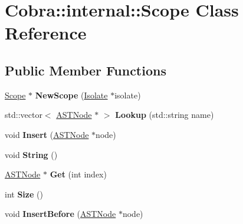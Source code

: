 \hypertarget{class_cobra_1_1internal_1_1_scope}{\section{Cobra\+:\+:internal\+:\+:Scope Class Reference}
\label{class_cobra_1_1internal_1_1_scope}
}
\subsection*{Public Member Functions}
\begin{DoxyCompactItemize}
\item 
\hypertarget{class_cobra_1_1internal_1_1_scope_a8a7296ef13e2f0c58950811bdca42576}{\hyperlink{class_cobra_1_1internal_1_1_scope}{Scope} $\ast$ {\bfseries New\+Scope} (\hyperlink{class_cobra_1_1internal_1_1_isolate}{Isolate} $\ast$isolate)}\label{class_cobra_1_1internal_1_1_scope_a8a7296ef13e2f0c58950811bdca42576}

\item 
\hypertarget{class_cobra_1_1internal_1_1_scope_acb50f97a2ee64adfd97a35fca951def6}{std\+::vector$<$ \hyperlink{class_cobra_1_1internal_1_1_a_s_t_node}{A\+S\+T\+Node} $\ast$ $>$ {\bfseries Lookup} (std\+::string name)}\label{class_cobra_1_1internal_1_1_scope_acb50f97a2ee64adfd97a35fca951def6}

\item 
\hypertarget{class_cobra_1_1internal_1_1_scope_a9a3ba5f69a60e821246b2234d7648508}{void {\bfseries Insert} (\hyperlink{class_cobra_1_1internal_1_1_a_s_t_node}{A\+S\+T\+Node} $\ast$node)}\label{class_cobra_1_1internal_1_1_scope_a9a3ba5f69a60e821246b2234d7648508}

\item 
\hypertarget{class_cobra_1_1internal_1_1_scope_aaebe9d128689e9bf14661ee56cf23fa6}{void {\bfseries String} ()}\label{class_cobra_1_1internal_1_1_scope_aaebe9d128689e9bf14661ee56cf23fa6}

\item 
\hypertarget{class_cobra_1_1internal_1_1_scope_a3d2c6d4045bacad731303aabb2babfb1}{\hyperlink{class_cobra_1_1internal_1_1_a_s_t_node}{A\+S\+T\+Node} $\ast$ {\bfseries Get} (int index)}\label{class_cobra_1_1internal_1_1_scope_a3d2c6d4045bacad731303aabb2babfb1}

\item 
\hypertarget{class_cobra_1_1internal_1_1_scope_a8e08e196bd7915f62fdc826ecd040c75}{int {\bfseries Size} ()}\label{class_cobra_1_1internal_1_1_scope_a8e08e196bd7915f62fdc826ecd040c75}

\item 
\hypertarget{class_cobra_1_1internal_1_1_scope_a34919fe65b37babd08d32855f7498193}{void {\bfseries Insert\+Before} (\hyperlink{class_cobra_1_1internal_1_1_a_s_t_node}{A\+S\+T\+Node} $\ast$node)}\label{class_cobra_1_1internal_1_1_scope_a34919fe65b37babd08d32855f7498193}

\end{DoxyCompactItemize}
